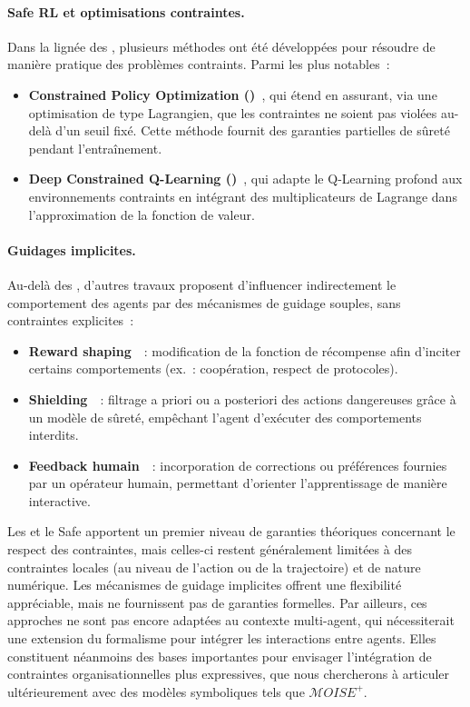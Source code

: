 \paragraph{Safe RL et optimisations contraintes.}
Dans la lignée des , plusieurs méthodes ont été développées pour résoudre de manière pratique
des problèmes contraints. Parmi les plus notables~:
\begin{itemize}
    \item \textbf{Constrained Policy Optimization ()}~\cite{achiam2017constrained},
          qui étend  en assurant,
          via une optimisation de type Lagrangien, que les contraintes ne soient
          pas violées au-delà d’un seuil fixé. Cette méthode fournit des garanties
          partielles de sûreté pendant l’entraînement.
    \item \textbf{Deep Constrained Q-Learning ()}~\cite{kalweit2020deep},
          qui adapte le Q-Learning profond aux environnements contraints
          en intégrant des multiplicateurs de Lagrange dans l’approximation
          de la fonction de valeur.
\end{itemize}

\paragraph{Guidages implicites.}
Au-delà des , d’autres travaux proposent d’influencer indirectement
le comportement des agents par des mécanismes de guidage souples,
sans contraintes explicites~:
\begin{itemize}
    \item \textbf{Reward shaping}~\cite{ng1999policy}~: modification de la fonction
          de récompense afin d’inciter certains comportements (ex.~: coopération,
          respect de protocoles).
    \item \textbf{Shielding}~\cite{amodei2016concrete}~: filtrage a priori ou a posteriori
          des actions dangereuses grâce à un modèle de sûreté,
          empêchant l’agent d’exécuter des comportements interdits.
    \item \textbf{Feedback humain}~\cite{warnell2018deep}~: incorporation de corrections
          ou préférences fournies par un opérateur humain,
          permettant d’orienter l’apprentissage de manière interactive.
\end{itemize}

Les  et le Safe  apportent un premier niveau de garanties théoriques concernant le respect des contraintes, mais celles-ci restent généralement limitées à des contraintes locales (au niveau de l’action ou de la trajectoire) et de nature numérique. Les mécanismes de guidage implicites offrent une flexibilité appréciable, mais ne fournissent pas de garanties formelles. Par ailleurs, ces approches ne sont pas encore adaptées au contexte multi-agent, qui nécessiterait une extension du formalisme pour intégrer les interactions entre agents. Elles constituent néanmoins des bases importantes pour envisager l’intégration de contraintes organisationnelles plus expressives, que nous chercherons à articuler ultérieurement avec des modèles symboliques tels que $\mathcal{M}OISE^+$.

